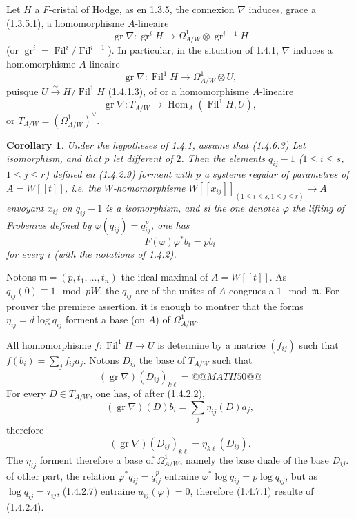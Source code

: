 \documentclass[12pt,a4paper]{article}
\theoremstyle{plain}
\newtheorem{corollary}[theorem]{Corollary}
\theoremstyle{definition}
\theoremstyle{remark}
\DeclareMathOperator{\Fil}{Fil}
\DeclareMathOperator{\gr}{gr}
\DeclareMathOperator{\Hom}{Hom}
\newcommand{\mf}{\mathfrak{m}}
\providecommand{\Hom}{\operatorname{Hom}}
\begin{document}
\subsubsection{}
Let $H$ a $F$-cristal of Hodge, as en 1.3.5, the connexion $\nabla$ induces, grace a (1.3.5.1), a homomorphisme $A$-lineaire
\begin{equation}\tag{1.4.6.1}
\gr\nabla : \gr^i H \longrightarrow \Omega^1_{A/W} \otimes \gr^{i-1} H 
\end{equation}
(or $\gr^i = \Fil^i/\Fil^{i+1}$). In particular, in the situation of 1.4.1, $\nabla$ induces a homomorphisme $A$-lineaire
\begin{equation}\tag{1.4.6.2}
\gr\nabla : \Fil^1 H \longrightarrow \Omega^1_{A/W} \otimes U, 
\end{equation}
puisque $U \xrightarrow{\sim} H/\Fil^1 H$ (1.4.1.3), of or a homomorphisme $A$-lineaire
\begin{equation}\tag{1.4.6.3}
\gr\nabla : T_{A/W} \longrightarrow \Hom_A(\Fil^1 H, U), 
\end{equation}
or $T_{A/W} = (\Omega^1_{A/W})^\vee$.

\begin{corollary}\label{cor:1.4.7}
Under the hypotheses of 1.4.1, assume that (1.4.6.3) Let isomorphism, and that $p$ let different of $2$. Then the elements $q_{ij} - 1$ ($1 \leqslant i \leqslant s$, $1 \leqslant j \leqslant r$) defined en (1.4.2.9) forment with $p$ a systeme regular of parametres of $A = W[[t]]$, i.e. the $W$-homomorphisme $W[[x_{ij}]]_{(1\leqslant i\leqslant s, 1\leqslant j\leqslant r)} \to A$ envoyant $x_{ij}$ on $q_{ij} - 1$ is a isomorphism, and si the one denotes $\varphi$ the lifting of Frobenius defined by $\varphi(q_{ij}) = q_{ij}^p$, one has
\begin{equation}\tag{1.4.7.1}
F(\varphi)\varphi^*b_i = pb_i 
\end{equation}
for every $i$ (with the notations of 1.4.2).
\end{corollary}

Notons $\mf = (p, t_1, \ldots, t_n)$ the ideal maximal of $A = W[[t]]$. As $q_{ij}(0) \equiv 1 \mod pW$, the $q_{ij}$ are of the unites of $A$ congrues a $1 \mod \mf$. For prouver the premiere assertion, it is enough to montrer that the forms $\eta_{ij} = d\log q_{ij}$ forment a base (on $A$) of $\Omega^1_{A/W}$.

All homomorphisme $f : \Fil^1 H \to U$ is determine by a matrice $(f_{ij})$ such that $f(b_i) = \sum_j f_{ij}a_j$. Notons $D_{ij}$ the base of $T_{A/W}$ such that
\[
(\gr\nabla)(D_{ij})_{k\ell} =
@@MATH50@@
\]
For every $D \in T_{A/W}$, one has, of after (1.4.2.2),
\[
(\gr\nabla)(D)b_i = \sum_j \eta_{ij}(D)a_j,
\]
therefore
\[
(\gr\nabla)(D_{ij})_{k\ell} = \eta_{k\ell}(D_{ij}).
\]
The $\eta_{ij}$ forment therefore a base of $\Omega^1_{A/W}$, namely the base duale of the base $D_{ij}$. of other part, the relation $\varphi^*q_{ij} = q_{ij}^p$ entraine $\varphi^*\log q_{ij} = p\log q_{ij}$, but as $\log q_{ij} = \tau_{ij}$, (1.4.2.7) entraine $u_{ij}(\varphi) = 0$, therefore (1.4.7.1) resulte of (1.4.2.4).
\end{document}
